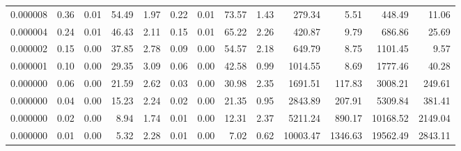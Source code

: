 \begin{tabular}{lrrrrrrrrrrrr}
0.000008 & 0.36 & 0.01 & 54.49 & 1.97 & 0.22 & 0.01 & 73.57 & 1.43 & 279.34 & 5.51 & 448.49 & 11.06 \\
0.000004 & 0.24 & 0.01 & 46.43 & 2.11 & 0.15 & 0.01 & 65.22 & 2.26 & 420.87 & 9.79 & 686.86 & 25.69 \\
0.000002 & 0.15 & 0.00 & 37.85 & 2.78 & 0.09 & 0.00 & 54.57 & 2.18 & 649.79 & 8.75 & 1101.45 & 9.57 \\
0.000001 & 0.10 & 0.00 & 29.35 & 3.09 & 0.06 & 0.00 & 42.58 & 0.99 & 1014.55 & 8.69 & 1777.46 & 40.28 \\
0.000000 & 0.06 & 0.00 & 21.59 & 2.62 & 0.03 & 0.00 & 30.98 & 2.35 & 1691.51 & 117.83 & 3008.21 & 249.61 \\
0.000000 & 0.04 & 0.00 & 15.23 & 2.24 & 0.02 & 0.00 & 21.35 & 0.95 & 2843.89 & 207.91 & 5309.84 & 381.41 \\
0.000000 & 0.02 & 0.00 & 8.94 & 1.74 & 0.01 & 0.00 & 12.31 & 2.37 & 5211.24 & 890.17 & 10168.52 & 2149.04 \\
0.000000 & 0.01 & 0.00 & 5.32 & 2.28 & 0.01 & 0.00 & 7.02 & 0.62 & 10003.47 & 1346.63 & 19562.49 & 2843.11 \\
\bottomrule
\end{tabular}
